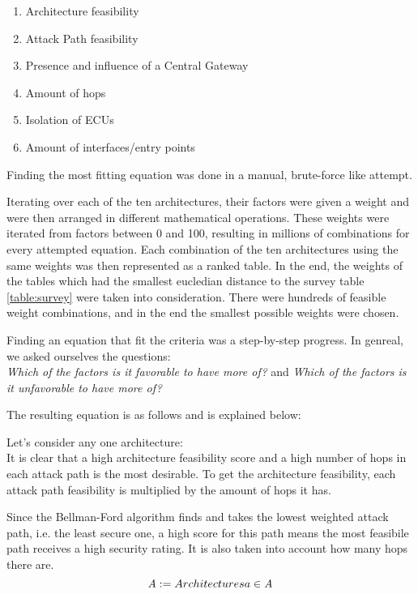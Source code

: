 \begin{enumerate}
    \item Architecture feasibility
    \item Attack Path feasibility
    \item Presence and influence of a Central Gateway
    \item Amount of hops 
    \item Isolation of ECUs
    \item Amount of interfaces/entry points
\end{enumerate}

Finding the most fitting equation was done in a manual, brute-force like attempt.

Iterating over each of the ten architectures, their factors were given a weight and were then arranged in different mathematical operations.
These weights were iterated from factors between 0 and 100, resulting in millions of combinations for every attempted equation.
Each combination of the ten architectures using the same weights was then represented as a ranked table. 
In the end, the weights of the tables which had the smallest eucledian distance to the survey table \ref{table:survey} were taken into consideration.
There were hundreds of feasible weight combinations, and in the end the smallest possible weights were chosen.

Finding an equation that fit the criteria was a step-by-step progress.
In genreal, we asked ourselves the questions:\\
\textit{Which of the factors is it favorable to have more of?} and \textit{Which of the factors is it unfavorable to have more of?}

The resulting equation is as follows and is explained below:

Let's consider any one architecture:\\
It is clear that a high architecture feasibility score and a high number of hops in each attack path is the most desirable.
To get the architecture feasibility, each attack path feasibility is multiplied by the amount of hops it has.
 
Since the Bellman-Ford algorithm finds and takes the lowest weighted attack path, i.e. the least secure one, 
a high score for this path means the most feasibile path receives a high security rating.
It is also taken into account how many hops there are. \\

\begin{equation}
    \mathit{A} := {Architectures} a \in \mathit{A} \label{eq:architectures}\\\\
\end{equation}

